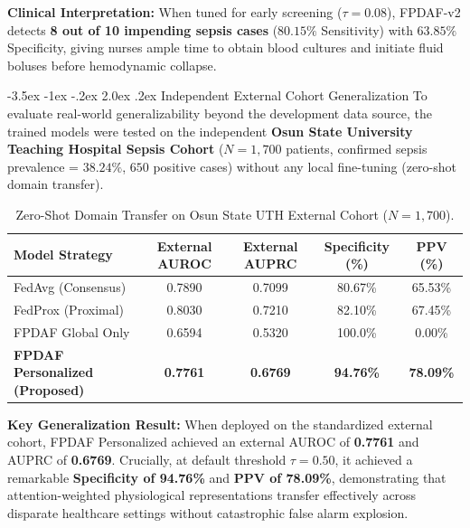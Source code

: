 \documentclass[11pt, a4paper]{article}
\makeatletter
\renewcommand\section{\@startsection {section}{1}{\z@}%
                                   {-3.5ex \@plus -1ex \@minus -.2ex}%
                                   {2.0ex \@plus.2ex}%
                                   {\normalfont\large\bfseries\color{amritaMaroon}}}
\makeatother
\begin{document}
\noindent
\textbf{Clinical Interpretation:} When tuned for early screening ($\tau=0.08$), FPDAF-v2 detects \textbf{8 out of 10 impending sepsis cases} ($80.15\%$ Sensitivity) with $63.85\%$ Specificity, giving nurses ample time to obtain blood cultures and initiate fluid boluses before hemodynamic collapse.

\section{Independent External Cohort Generalization}
To evaluate real-world generalizability beyond the development data source, the trained models were tested on the independent \textbf{Osun State University Teaching Hospital Sepsis Cohort} ($N=1,700$ patients, confirmed sepsis prevalence = $38.24\%$, $650$ positive cases) without any local fine-tuning (zero-shot domain transfer).

\begin{table}[H]
\centering
\small
\renewcommand{\arraystretch}{1.2}
\begin{tabular}{lcccc}
\toprule
\textbf{Model Strategy} & \textbf{External AUROC} & \textbf{External AUPRC} & \textbf{Specificity (\%)} & \textbf{PPV (\%)} \\
\midrule
FedAvg (Consensus) & 0.7890 & 0.7099 & 80.67\% & 65.53\% \\
FedProx (Proximal) & 0.8030 & 0.7210 & 82.10\% & 67.45\% \\
FPDAF Global Only & 0.6594 & 0.5320 & 100.0\% & 0.00\% \\
\textbf{FPDAF Personalized (Proposed)} & \textbf{0.7761} & \textbf{0.6769} & \textbf{94.76\%} & \textbf{78.09\%} \\
\bottomrule
\end{tabular}
\caption{Zero-Shot Domain Transfer on Osun State UTH External Cohort ($N=1,700$).}
\label{tab:external_validation}
\end{table}

\noindent
\textbf{Key Generalization Result:} When deployed on the standardized external cohort, FPDAF Personalized achieved an external AUROC of \textbf{0.7761} and AUPRC of \textbf{0.6769}. Crucially, at default threshold $\tau=0.50$, it achieved a remarkable \textbf{Specificity of 94.76\%} and \textbf{PPV of 78.09\%}, demonstrating that attention-weighted physiological representations transfer effectively across disparate healthcare settings without catastrophic false alarm explosion.
\end{document}
